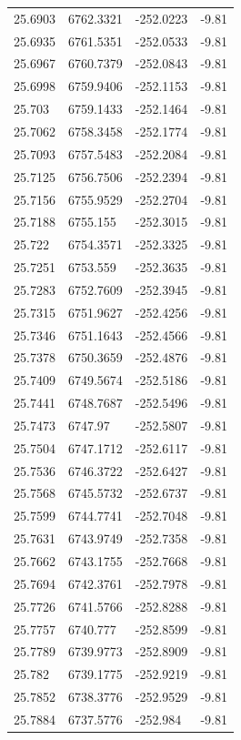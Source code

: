 \begin{table}[H]
\begin{tabular}{llll}
25.6903 & 6762.3321 & -252.0223 & -9.81 \\
25.6935 & 6761.5351 & -252.0533 & -9.81 \\
25.6967 & 6760.7379 & -252.0843 & -9.81 \\
25.6998 & 6759.9406 & -252.1153 & -9.81 \\
25.703 & 6759.1433 & -252.1464 & -9.81 \\
25.7062 & 6758.3458 & -252.1774 & -9.81 \\
25.7093 & 6757.5483 & -252.2084 & -9.81 \\
25.7125 & 6756.7506 & -252.2394 & -9.81 \\
25.7156 & 6755.9529 & -252.2704 & -9.81 \\
25.7188 & 6755.155 & -252.3015 & -9.81 \\
25.722 & 6754.3571 & -252.3325 & -9.81 \\
25.7251 & 6753.559 & -252.3635 & -9.81 \\
25.7283 & 6752.7609 & -252.3945 & -9.81 \\
25.7315 & 6751.9627 & -252.4256 & -9.81 \\
25.7346 & 6751.1643 & -252.4566 & -9.81 \\
25.7378 & 6750.3659 & -252.4876 & -9.81 \\
25.7409 & 6749.5674 & -252.5186 & -9.81 \\
25.7441 & 6748.7687 & -252.5496 & -9.81 \\
25.7473 & 6747.97 & -252.5807 & -9.81 \\
25.7504 & 6747.1712 & -252.6117 & -9.81 \\
25.7536 & 6746.3722 & -252.6427 & -9.81 \\
25.7568 & 6745.5732 & -252.6737 & -9.81 \\
25.7599 & 6744.7741 & -252.7048 & -9.81 \\
25.7631 & 6743.9749 & -252.7358 & -9.81 \\
25.7662 & 6743.1755 & -252.7668 & -9.81 \\
25.7694 & 6742.3761 & -252.7978 & -9.81 \\
25.7726 & 6741.5766 & -252.8288 & -9.81 \\
25.7757 & 6740.777 & -252.8599 & -9.81 \\
25.7789 & 6739.9773 & -252.8909 & -9.81 \\
25.782 & 6739.1775 & -252.9219 & -9.81 \\
25.7852 & 6738.3776 & -252.9529 & -9.81 \\
25.7884 & 6737.5776 & -252.984 & -9.81 \\

\end{tabular}
\end{table}
